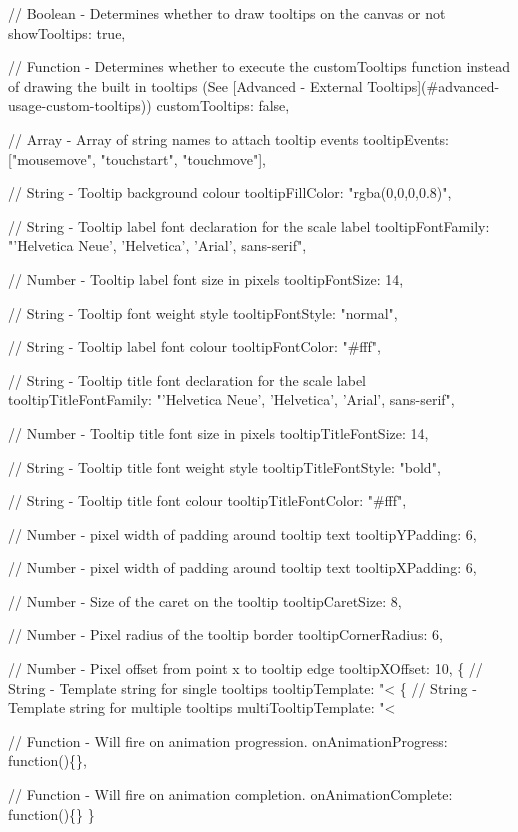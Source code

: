 \begin{DoxyCode}
    // Boolean - Determines whether to draw tooltips on the canvas or not
    showTooltips: true,

    // Function - Determines whether to execute the customTooltips function instead of drawing the built in
       tooltips (See [Advanced - External Tooltips](#advanced-usage-custom-tooltips))
    customTooltips: false,

    // Array - Array of string names to attach tooltip events
    tooltipEvents: ["mousemove", "touchstart", "touchmove"],

    // String - Tooltip background colour
    tooltipFillColor: "rgba(0,0,0,0.8)",

    // String - Tooltip label font declaration for the scale label
    tooltipFontFamily: "'Helvetica Neue', 'Helvetica', 'Arial', sans-serif",

    // Number - Tooltip label font size in pixels
    tooltipFontSize: 14,

    // String - Tooltip font weight style
    tooltipFontStyle: "normal",

    // String - Tooltip label font colour
    tooltipFontColor: "#fff",

    // String - Tooltip title font declaration for the scale label
    tooltipTitleFontFamily: "'Helvetica Neue', 'Helvetica', 'Arial', sans-serif",

    // Number - Tooltip title font size in pixels
    tooltipTitleFontSize: 14,

    // String - Tooltip title font weight style
    tooltipTitleFontStyle: "bold",

    // String - Tooltip title font colour
    tooltipTitleFontColor: "#fff",

    // Number - pixel width of padding around tooltip text
    tooltipYPadding: 6,

    // Number - pixel width of padding around tooltip text
    tooltipXPadding: 6,

    // Number - Size of the caret on the tooltip
    tooltipCaretSize: 8,

    // Number - Pixel radius of the tooltip border
    tooltipCornerRadius: 6,

    // Number - Pixel offset from point x to tooltip edge
    tooltipXOffset: 10,
    \{%
    // String - Template string for single tooltips
    tooltipTemplate: "<%
    \{%
    // String - Template string for multiple tooltips
    multiTooltipTemplate: "<%

    // Function - Will fire on animation progression.
    onAnimationProgress: function()\{\},

    // Function - Will fire on animation completion.
    onAnimationComplete: function()\{\}
\}
\end{DoxyCode}


